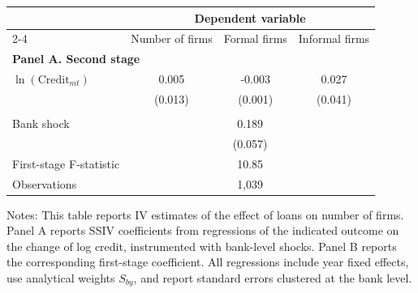 \centering
\begin{threeparttable}
\begin{tabular}{lccc}
\toprule
& \multicolumn{3}{c}{\textbf{Dependent variable}} \\
\cmidrule(lr){2-4}
& Number of firms 
& Formal firms
& Informal firms \\
\midrule
\multicolumn{4}{l}{\textbf{Panel A. Second stage}} \\
$\ln(\text{Credit}_{mt})$ 
& 0.005 & -0.003 & 0.027 \\
& (0.013) & (0.001) & (0.041) \\
\addlinespace
\multicolumn{4}{l}{\textbf{Panel B. First stage}} \\
Bank shock
& \multicolumn{3}{c}{0.189} \\
& \multicolumn{3}{c}{(0.057)} \\
\addlinespace
First-stage F-statistic
& \multicolumn{3}{c}{10.85} \\
\addlinespace
Observations
& \multicolumn{3}{c}{1,039} \\
\bottomrule
\end{tabular}
\begin{tablenotes}[flushleft]
\tiny
\item Notes: This table reports IV estimates of the effect of loans on number of firms. Panel A reports SSIV coefficients from regressions of the indicated outcome on the change of log credit, instrumented with bank-level shocks. Panel B reports the corresponding first-stage coefficient. All regressions include year fixed effects, use analytical weights $S_{by}$, and report standard errors clustered at the bank level.
\end{tablenotes}
\end{threeparttable}
